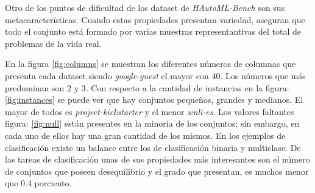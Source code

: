 Otro de los puntos de dificultad de los dataset de \textit{HAutoML-Bench} son sus metacaracterísticas. Cuando estas propiedades presentan
variedad, aseguran que todo el conjunto está formado por varias muestras representantivas del total de problemas de la vida real.

En la figura \ref{fig:columns} se muestran los diferentes números de columnas que presenta cada dataset siendo \textit{google-guest} el mayor con 40. 
Los números que más predominan son 2 y 3. 
Con respecto a la cantidad de instancias en la figura: \ref{fig:instances} se puede ver que hay conjuntos pequeños, grandes y medianos.
El mayor de todos es \textit{project-kickstarter} y el menor \textit{wnli-es}.
Los valores faltantes figura: \ref{fig:null} están presentes en la minoría de los conjuntos; sin embargo, en cada uno de ellos hay una 
gran cantidad de los mismos. 
En los ejemplos de clasificación existe un balance entre los de clasificación binaria y multiclase. De las tareas de clasificación unas de sus propiedades más interesantes 
son el número de conjuntos que poseen desequilibrio y el grado que presentan, es muchos menor que 0.4 porciento. 


